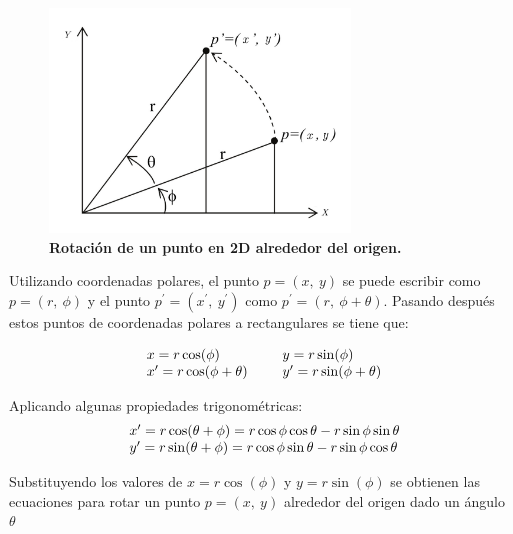 \begin{center}
\begin{figure}[h]
\includegraphics[width=8cm]{Img/GEO/geo-rot2d.jpg}
\centering
\caption{\textbf{\footnotesize{Rotación de un punto en 2D alrededor del origen.}}}
\end{figure}
\end{center}

Utilizando coordenadas polares, el punto $p = (x, \ y)$ se puede escribir como $p = (r, \ \phi)$ y el punto $p^{\prime} = ({x}^{\prime},\ {y}^{\prime})$ como $p^{\prime} = (r, \ \phi + \theta)$. Pasando después estos puntos de coordenadas polares a rectangulares se tiene que:


$$
\begin{array}{rccl}
\begin{array}{l@{}l}
x = r \cos(\phi) \\
{x}^{\prime} = r \cos(\phi + \theta)
\end{array}
\end{array}
\ \ \ 
\begin{array}{rccl}
\begin{array}{l@{}l}
y = r \sin(\phi) \\
{y}^{\prime} = r \sin(\phi + \theta)
\end{array}
\end{array} 
$$



Aplicando algunas propiedades trigonométricas:
$$
\begin{array}{l@{}l}
{x}^{\prime} = r \cos(\theta + \phi) = r \cos \phi \cos \theta - r \sin \phi \sin \theta
\\
{y}^{\prime} = r \sin(\theta + \phi) = r \cos \phi \sin \theta - r \sin \phi \cos \theta
\end{array}
$$



Substituyendo los valores de $x = r \cos(\phi)$ y $y = r \sin(\phi)$ se obtienen las ecuaciones para rotar un punto $p = (x, \ y)$ alrededor del origen dado un ángulo $\theta$

